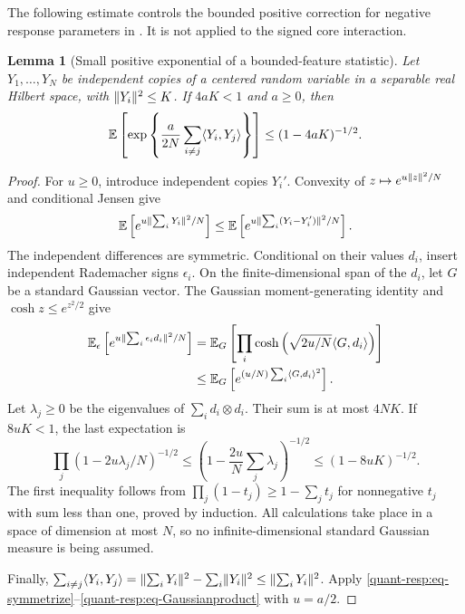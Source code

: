 \documentclass[11pt,reqno]{amsart}
\numberwithin{equation}{section}
\theoremstyle{plain}
\newtheorem{lemma}[lemma]{Lemma}
\theoremstyle{remark}
\DeclarePairedDelimiter{\norm}{\lVert}{\rVert}
\DeclarePairedDelimiter{\ipp}{\langle}{\rangle}
\newcommand{\E}{{\mathbb{E}}}
\begin{document}
The following estimate controls the bounded positive correction for
negative response parameters in .
It is not applied to the signed core interaction.
\begin{lemma}[Small positive exponential of a bounded-feature statistic]\label{quant-resp:lem-boundedfeatureexp}
Let $Y_1,\ldots,Y_N$ be independent copies of a centered random variable in a separable real Hilbert space, with $\norm{Y_i}^2\leq K$. If $4aK<1$ and $a\geq0$, then
\begin{equation}\label{quant-resp:eq-boundedfeatureexp}
 \E\left[\exp\left\{\frac a{2N}\sum_{i\ne j}\ipp*{Y_i,Y_j}\right\}\right]
 \leq(1-4aK)^{-1/2}.
\end{equation}
\end{lemma}
\begin{proof}
For $u\geq0$, introduce independent copies $Y_i'$. Convexity of $z\mapsto e^{u\norm z^2/N}$ and conditional Jensen give
\begin{equation}\label{quant-resp:eq-symmetrize}
 \E\left[e^{u\norm{\sum_iY_i}^2/N}\right]
 \leq\E\left[e^{u\norm{\sum_i(Y_i-Y_i')}^2/N}\right].
\end{equation}
The independent differences are symmetric. Conditional on their values $d_i$, insert independent Rademacher signs $\epsilon_i$. On the finite-dimensional span of the $d_i$, let $G$ be a standard Gaussian vector. The Gaussian moment-generating identity and $\cosh z\leq e^{z^2/2}$ give
\begin{align}
 \E_\epsilon\left[e^{u\norm{\sum_i\epsilon_id_i}^2/N}\right]
 &=\E_G\left[\prod_i\cosh\left(\sqrt{2u/N}\ipp*{G,d_i}\right)\right]\notag\\
 &\leq\E_G\left[e^{(u/N)\sum_i\ipp*{G,d_i}^2}\right].\label{quant-resp:eq-Gaussianbound}
\end{align}
Let $\lambda_j\geq0$ be the eigenvalues of $\sum_i d_i\otimes d_i$. Their sum is at most $4NK$. If $8uK<1$, the last expectation is
\begin{equation}\label{quant-resp:eq-Gaussianproduct}
 \prod_j(1-2u\lambda_j/N)^{-1/2}
 \leq\left(1-\frac{2u}N\sum_j\lambda_j\right)^{-1/2}
 \leq(1-8uK)^{-1/2}.
\end{equation}
The first inequality follows from $\prod_j(1-t_j)\geq1-\sum_jt_j$ for nonnegative $t_j$ with sum less than one, proved by induction. All calculations take place in a space of dimension at most $N$, so no infinite-dimensional standard Gaussian measure is being assumed.

Finally, $\sum_{i\ne j}\ipp*{Y_i,Y_j}=\norm{\sum_iY_i}^2-\sum_i\norm{Y_i}^2\leq\norm{\sum_iY_i}^2$. Apply \eqref{quant-resp:eq-symmetrize}--\eqref{quant-resp:eq-Gaussianproduct} with $u=a/2$.
\end{proof}
\end{document}
